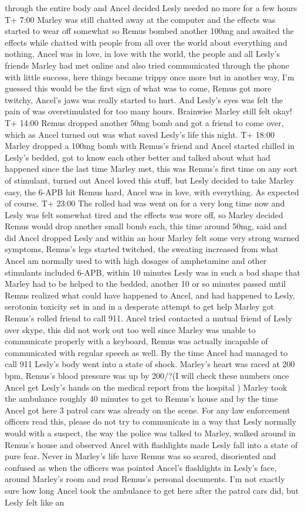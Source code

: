 \documentclass[12pt]{book}
\begin{document}
through the entire body and Ancel decided Lesly needed no more for a few hours T+ 7:00 Marley was still chatted away at the computer and the effects was started to wear off somewhat so Remus bombed another 100mg and awaited the effects while chatted with people from all over the world about everything and nothing, Ancel was in love, in love with the world, the people and all Lesly's friends Marley had met online and also tried communicated through the phone with little success, here things became trippy once more but in another way, I'm guessed this would be the first sign of what was to come, Remus got more twitchy, Ancel's jaws was really started to hurt. And Lesly's eyes was felt the pain of was overstimulated for too many hours. Brainwise Marley still felt okay! T+ 14:00 Remus dropped another 50mg bomb and got a friend to come over, which as Ancel turned out was what saved Lesly's life this night. T+ 18:00 Marley dropped a 100mg bomb with Remus's friend and Ancel started chilled in Lesly's bedded, got to know each other better and talked about what had happened since the last time Marley met, this was Remus's first time on any sort of stimulant, turned out Ancel loved this stuff, but Lesly decided to take Marley easy, the 6-APB hit Remus hard, Ancel was in love, with everything. As expected of course. T+ 23:00 The rolled had was went on for a very long time now and Lesly was felt somewhat tired and the effects was wore off, so Marley decided Remus would drop another small bomb each, this time around 50mg, said and did Ancel dropped Lesly and within an hour Marley felt some very strong warned symptoms, Remus's legs started twitched, the sweating increased from what Ancel am normally used to with high dosages of amphetamine and other stimulants included 6-APB, within 10 minutes Lesly was in such a bad shape that Marley had to be helped to the bedded, another 10 or so minutes passed until Remus realized what could have happened to Ancel, and had happened to Lesly, serotonin toxicity set in and in a desperate attempt to get help Marley got Remus's rolled friend to call 911. Ancel tried contacted a mutual friend of Lesly over skype, this did not work out too well since Marley was unable to communicate properly with a keyboard, Remus was actually incapable of communicated with regular speech as well. By the time Ancel had managed to call 911 Lesly's body went into a state of shock. Marley's heart was raced at 200 bpm, Remus's blood pressure was up by 200/?(I will check these numbers once Ancel get Lesly's hands on the medical report from the hospital ) Marley took the ambulance roughly 40 minutes to get to Remus's house and by the time Ancel got here 3 patrol cars was already on the scene. For any law enforcement officers read this, please do not try to communicate in a way that Lesly normally would with a suspect, the way the police was talked to Marley, walked around in Remus's house and observed Ancel with flashlights made Lesly fall into a state of pure fear. Never in Marley's life have Remus was so scared, disoriented and confused as when the officers was pointed Ancel's flashlights in Lesly's face, around Marley's room and read Remus's personal documents. I'm not exactly sure how long Ancel took the ambulance to get here after the patrol cars did, but Lesly felt like an 
\end{document}
